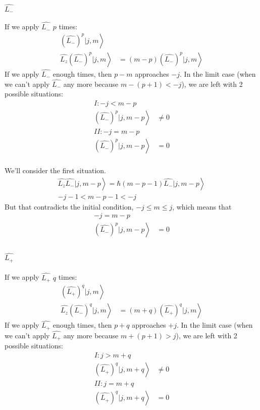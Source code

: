 			\paragraph{$\hat{L_-}$}
				If we apply $\hat{L_-}$ $p$ times:
				\begin{align}
					\left. \left(\hat{L_-}\right)^p | j,m \right\rangle &\\
					\left. \hat{L_z}\left(\hat{L_-}\right)^p | j,m \right\rangle &= \left. (m-p)\left(\hat{L_-}\right)^p | j,m \right\rangle
				\end{align}
				If we apply $\hat{L_-}$ enough times, then $p-m$ approaches $-j$. In the limit case (when we can't apply  $\hat{L_-}$ any more because $m-(p+1) < -j$), we are left with 2 possible situations:
				\begin{align}
					I: -j < m - p&\\
					\left. \left(\hat{L_-}\right)^p | j,m-p \right\rangle &\neq 0 \\
					II: -j = m - p&\\
					\left. \left(\hat{L_-}\right)^p | j,m-p \right\rangle &= 0 \\
				\end{align}
				
				We'll consider the first situation.
				\begin{align}
					\left. \hat{L_z}\hat{L_-} | j,m-p \right\rangle	 = \left. \hbar(m-p-1) \hat{L_-}| j,m-p \right\rangle \\
					-j -1 < m-p-1 < -j
				\end{align}
				But that contradicts the initial condition, $-j \leq m \leq j$, which means that
				\begin{align}
					-j = m - p& \\ 
					\left. \left(\hat{L_-}\right)^p | j,m-p \right\rangle &= 0 \\
				\end{align}
			\paragraph{$\hat{L_+}$}
				If we apply $\hat{L_+}$ $q$ times:
				\begin{align}
					\left. \left(\hat{L_+}\right)^q | j,m \right\rangle &\\
					\left. \hat{L_z}\left(\hat{L_-}\right)^q | j,m \right\rangle &= \left. (m+q)\left(\hat{L_+}\right)^q | j,m \right\rangle
				\end{align}
				If we apply $\hat{L_+}$ enough times, then $p+q$ approaches $+j$. In the limit case (when we can't apply  $\hat{L_+}$ any more because $m+(p+1) > j$), we are left with 2 possible situations:
				\begin{align}
					I: j > m + q&\\
					\left. \left(\hat{L_+}\right)^q | j,m+q \right\rangle &\neq 0 \\
					II: j = m + q &\\
					\left. \left(\hat{L_+}\right)^q | j,m+q \right\rangle &= 0 \\
				\end{align}
				
